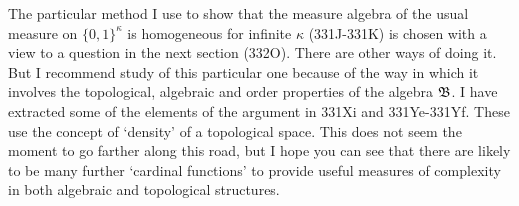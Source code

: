 {The particular method I use to show that the measure algebra of the
usual measure on $\{0,1\}^{\kappa}$ is homogeneous for infinite $\kappa$
(331J-331K) is chosen with a view to a question in the next section
(332O).   There are other ways of doing it.   But I recommend study of
this particular one because of the way in which it involves the
topological, algebraic and order properties of the algebra $\frak B$.
I have extracted some of the elements of the argument in 331Xi and
331Ye-331Yf.   These use the concept of `density' of a topological
space.   This does not seem the moment to go farther along this road,
but I hope you can see that there are likely to be many further
`cardinal functions' to provide useful measures of complexity in both
algebraic and topological structures.
}%

\discrpage





